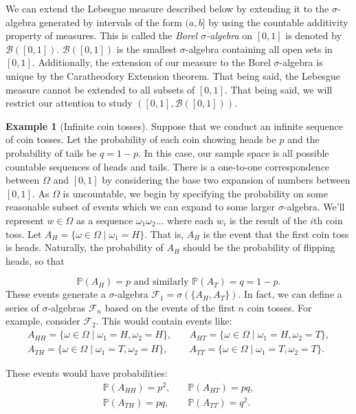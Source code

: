 \documentclass[12pt]{article}
\newcommand{\calF}{\mathcal{F}}
\newcommand{\Prob}{\mathbb{P}}
\theoremstyle{definition}
\newtheorem{exmp}[thm]{Example}
\theoremstyle{remark}
\numberwithin{equation}{section}
\begin{document}
We can extend the Lebesgue measure described below by extending it to the $\sigma$-algebra generated by intervals of the form $(a,b]$ by using the countable additivity property of measures. This is called the \emph{Borel $\sigma$-algebra} on $[0,1]$ is denoted by $\mathcal{B}([0,1])$. $\mathcal{B}([0,1])$ is the smallest $\sigma$-algebra containing all open sets in $[0,1]$. Additionally, the extension of our measure to the Borel $\sigma$-algebra is unique by the Caratheodory Extension theorem. That being said, the Lebesgue measure cannot be extended to all subsets of $[0,1]$. That being said, we will restrict our attention to study $([0,1], \mathcal{B}([0,1]))$. 

\begin{exmp}[Infinite coin tosses]
  Suppose that we conduct an infinite sequence of coin tosses. Let the probability of each coin showing heads be $p$ and the probability of tails be $q=1-p$. In this case, our sample space is all possible countable sequences of heads and tails. There is a one-to-one correspondence between $\Omega$ and $[0,1]$ by considering the base two expansion of numbers between $[0,1]$. As $\Omega$ is uncountable, we begin by specifying the probability on some reasonable subset of events which we can expand to some larger $\sigma$-algebra. We'll represent $w\in\Omega$ as a sequence $\omega_1\omega_2\ldots$ where each $w_i$ is the result of the $i$th coin toss. Let $A_H = \{ \omega\in\Omega\mid \omega_1 = H \}$.  That is, $A_H$ is the event that the first coin toss is heads. Naturally, the probability of $A_H$ should be the probability of flipping heads, so that

  \begin{equation}
    \Prob(A_H) = p \text{ and similarly } \Prob(A_T) = q = 1 - p.
  \end{equation}
  These events generate a $\sigma$-algebra $\calF_1 = \sigma(\{A_H, A_T \})$. In fact, we can define a series of $\sigma$-algebras $\calF_n$ based on the events of the first $n$ coin tosses. For example, consider $\calF_2$. This would contain events like:
\begin{align}
A_{HH} = \{\omega\in\Omega \mid \omega_1 = H, \omega_2 = H\}, &\quad A_{HT} = \{\omega\in\Omega \mid \omega_1 = H, \omega_2 = T\}, \\
A_{TH}= \{\omega\in\Omega \mid \omega_1 = T, \omega_2 = H\}, &\quad A_{TT}= \{\omega\in\Omega \mid \omega_1 = T, \omega_2 = T\}.
\end{align}

These events would have probabilities:
\begin{align}
  \Prob(A_{HH}) = p^2, &\quad \Prob(A_{HT}) = pq, \\
  \Prob(A_{TH}) = pq, &\quad \Prob(A_{TT}) = q^2.
\end{align}


\end{exmp}
\end{document}
